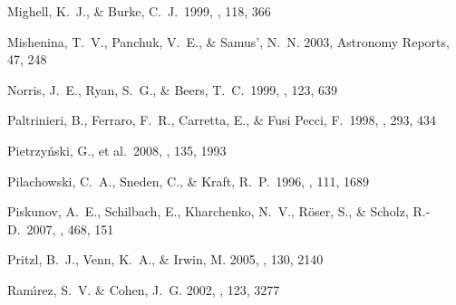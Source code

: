 \documentclass{emulateapj}
\begin{document}
\begin{thebibliography}{}
 Mighell, K.~J., \& Burke,
  C.~J.\ 1999, \aj, 118, 366

  Mishenina, T.~V., Panchuk, V.~E., \& Samus', N.~N. 2003, Astronomy
  Reports, 47, 248





 Norris, J.~E., Ryan, S.~G., \&
  Beers, T.~C.\ 1999, \apjs, 123, 639


 Paltrinieri, B., Ferraro,
  F.~R., Carretta, E., \& Fusi Pecci, F.\ 1998, \mnras, 293, 434

 Pietrzy{\'n}ski, G., et
  al.\ 2008, \aj, 135, 1993

 Pilachowski, C.~A., Sneden,
  C., \& Kraft, R.~P.\ 1996, \aj, 111, 1689

 Piskunov, A.~E., Schilbach, E.,
  Kharchenko, N.~V., R{\"o}ser, S., \& Scholz, R.-D.\ 2007, \aap, 468,
  151



 Pritzl,
  B.~J., Venn, K.~A., \& Irwin, M. 2005, \aj, 130, 2140


 Ram{\'{\i}}rez, S.~V. \&
  Cohen, J.~G. 2002, \aj, 123, 3277


\end{thebibliography}
\end{document}
